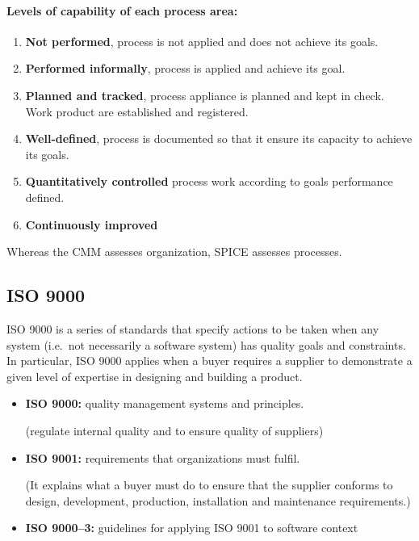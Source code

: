 \paragraph{Levels of capability of each process area:}
\begin{enumerate}
    \item \textbf{Not performed}, process is not applied
     and does not achieve its goals.
    \item \textbf{Performed informally}, process is applied and achieve its
    goal.
    \item \textbf{Planned and tracked}, process appliance is planned and
    kept in check. Work product are established and registered.
    \item \textbf{Well-defined}, process is documented so that it ensure its
    capacity to achieve its goals.
    \item \textbf{Quantitatively controlled} process work according to
    goals performance defined.
    \item \textbf{Continuously improved}
\end{enumerate}

Whereas the CMM assesses organization, SPICE assesses processes.

\subsection{ISO 9000}

ISO 9000 is a series of standards that specify actions to be taken when any
system (i.e.\ not necessarily a software system) has quality goals and
constraints. In particular, ISO 9000 applies when a buyer requires a supplier
to demonstrate a given level of expertise in designing and building a product.

\begin{itemize}
    \item \textbf{ISO 9000:} quality management systems and principles.

        (regulate internal quality and to ensure quality of suppliers)

    \item \textbf{ISO 9001:} requirements that organizations must fulfil.

        (It explains what a buyer must do to ensure that the supplier conforms to
        design, development, production, installation and maintenance requirements.)

    \item \textbf{ISO 9000--3:} guidelines for applying ISO 9001 to
        software context
\end{itemize}

